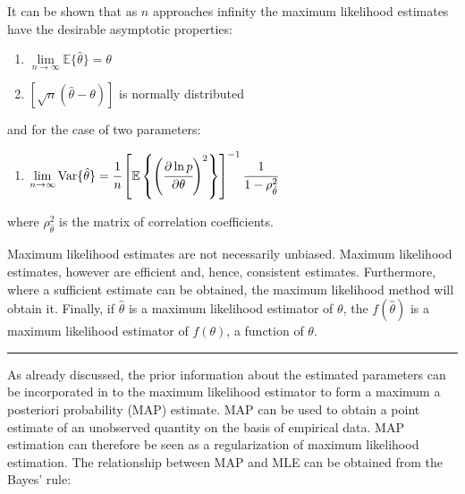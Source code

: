 \documentclass[../Article_Model_Parameters.tex]{subfiles}
\begin{document}
		\iffalse
		
		It can be shown that as $n$ approaches infinity the maximum likelihood estimates have the desirable asymptotic properties:
		
		\begin{enumerate}[label=(\arabic*)]
			\item {\footnotesize $\lim\limits_{n \rightarrow \infty} \mathbb{E}\{\hat{\theta}\} = \theta$ }
			\item {\footnotesize $\left[ \sqrt{n}\left( \hat{\theta} - \theta \right) \right]$ } is normally distributed
		\end{enumerate}
		and for the case of two parameters:
		
		\begin{enumerate}[resume,label=(\arabic*)]
			\item {\footnotesize $\lim\limits_{n \rightarrow \infty} \text{Var}\{\hat{\theta}\} = \cfrac{1}{n} \left[ \mathbb{E} \left\{ \left( \cfrac{\partial \ln p}{\partial \theta} \right)^2 \right\} \right]^{-1} \cfrac{1}{1-\rho^2_{\hat{\theta}}} $ } \label{Assumption_MLE}
		\end{enumerate}
		
		where $\rho^2_{\hat{\theta}}$ is the matrix of correlation coefficients.
		
		Maximum likelihood estimates are not necessarily unbiased. Maximum likelihood estimates, however are efficient and, hence, consistent estimates. Furthermore, where a sufficient estimate can be obtained, the maximum likelihood method will obtain it. Finally, if $\hat{\theta}$ is a maximum likelihood estimator of $\theta$, the $f\left( \hat{\theta} \right)$ is a maximum likelihood estimator of $f\left( \theta \right)$, a function of $\theta$.
		
		
		
		\hrule
		
		
		As already discussed, the prior information about the estimated parameters can be incorporated in to the maximum likelihood estimator to form a maximum a posteriori probability (MAP) estimate. MAP can be used to obtain a point estimate of an unobserved quantity on the basis of empirical data. MAP estimation can therefore be seen as a regularization of maximum likelihood estimation. The relationship between MAP and MLE can be obtained from the Bayes' rule:
		
\end{document}
